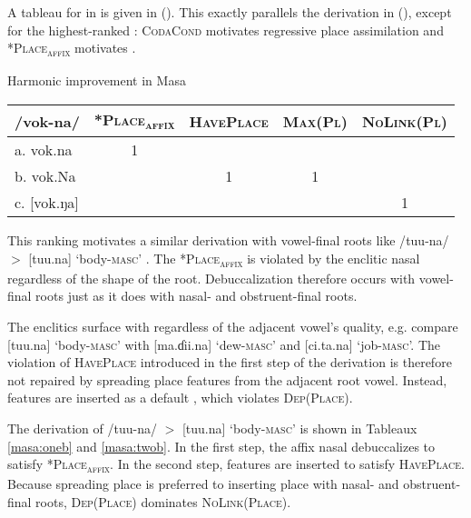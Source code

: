 \documentclass[output=paper,newtxmath,modfonts,nonflat,hidelinks]{langsci/langscibook}
\begin{document}
{ 
A  tableau for  in  is given in (). This exactly parallels the derivation in  (), except for the highest-ranked : \textsc{CodaCond} motivates regressive place assimilation and \textsc{*Place\textsubscript{affix}} motivates .

\begin{tableau}
	\caption{Harmonic improvement in Masa}
	\label{harmonicimprovement:masa}
    \begin{tabular}{|l||c|c:c|c|} \hline
    /{vok-na}/ &
    	\textsc{*Place\textsubscript{affix}} &
        \textsc{HavePlace} &
        \textsc{Max(Pl)} & 
        \textsc{NoLink(Pl)}\\
    \hline \hline
	a. {vok.na}            & 1 &   &   &   \\ \hline
    b. {vok.}N{a}     &   & 1 & 1 &   \\ \hline
    c. [{vok.ŋa}]          &   &   &   & 1 \\ \hline
    \end{tabular}
\end{tableau}

This %
ranking motivates a similar derivation with vowel-final roots like /{tuu-na}/ $>$ [{tuu.na}] `body-\textsc{masc}' . The  \textsc{*Place\textsubscript{affix}} is violated by the enclitic nasal regardless of the shape of the root. Debuccalization therefore occurs with vowel-final roots just as it does with nasal- and obstruent-final roots.

The enclitics surface with  regardless of the adjacent vowel's quality, e.g. compare [{tuu.na}] `body-\textsc{masc}' with [{ma.ɗii.na}] `dew-\textsc{masc}' and [{ci.ta.na}] `job-\textsc{masc}'. The violation of \textsc{HavePlace} introduced in the first step of the derivation is therefore not repaired by spreading place features from the adjacent root vowel. Instead,  features are inserted as a default \citep{lombardi2002,delacy2006}, which violates \textsc{Dep(Place)}.

The derivation of /{tuu-na}/ $>$ [{tuu.na}] `body-\textsc{masc}'  is shown in Tableaux \ref{masa:oneb} and \ref{masa:twob}. In the first step, the affix nasal debuccalizes to satisfy \textsc{*Place\textsubscript{affix}}. In the second step,  features are inserted to satisfy \textsc{HavePlace}. Because spreading place is preferred to inserting place with nasal- and obstruent-final roots, \textsc{Dep(Place)} dominates \textsc{NoLink(Place)}. 


}
\end{document}
